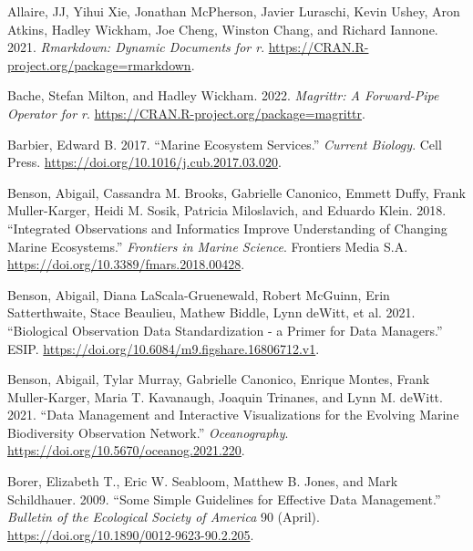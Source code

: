 \documentclass[
]{book}
\newlength{\cslhangindent}
\newlength{\cslentryspacingunit} %
\newenvironment{CSLReferences}[2] %
 {%
  \setlength{\parindent}{0pt}
  \ifodd #1
  \let\oldpar\par
  \def\par{\hangindent=\cslhangindent\oldpar}
  \fi
  \setlength{\parskip}{#2\cslentryspacingunit}
 }%
 {}
\begin{document}
\hypertarget{refs}{}
\begin{CSLReferences}{1}{0}
\leavevmode{}%
Allaire, JJ, Yihui Xie, Jonathan McPherson, Javier Luraschi, Kevin Ushey, Aron Atkins, Hadley Wickham, Joe Cheng, Winston Chang, and Richard Iannone. 2021. \emph{Rmarkdown: Dynamic Documents for r}. \url{https://CRAN.R-project.org/package=rmarkdown}.

\leavevmode{}%
Bache, Stefan Milton, and Hadley Wickham. 2022. \emph{Magrittr: A Forward-Pipe Operator for r}. \url{https://CRAN.R-project.org/package=magrittr}.

\leavevmode{}%
Barbier, Edward B. 2017. {``Marine Ecosystem Services.''} \emph{Current Biology}. Cell Press. \url{https://doi.org/10.1016/j.cub.2017.03.020}.

\leavevmode{}%
Benson, Abigail, Cassandra M. Brooks, Gabrielle Canonico, Emmett Duffy, Frank Muller-Karger, Heidi M. Sosik, Patricia Miloslavich, and Eduardo Klein. 2018. {``Integrated Observations and Informatics Improve Understanding of Changing Marine Ecosystems.''} \emph{Frontiers in Marine Science}. Frontiers Media S.A. \url{https://doi.org/10.3389/fmars.2018.00428}.

\leavevmode{}%
Benson, Abigail, Diana LaScala-Gruenewald, Robert McGuinn, Erin Satterthwaite, Stace Beaulieu, Mathew Biddle, Lynn deWitt, et al. 2021. {``Biological Observation Data Standardization - a Primer for Data Managers.''} ESIP. \url{https://doi.org/10.6084/m9.figshare.16806712.v1}.

\leavevmode{}%
Benson, Abigail, Tylar Murray, Gabrielle Canonico, Enrique Montes, Frank Muller-Karger, Maria T. Kavanaugh, Joaquin Trinanes, and Lynn M. deWitt. 2021. {``Data Management and Interactive Visualizations for the Evolving Marine Biodiversity Observation Network.''} \emph{Oceanography}. \url{https://doi.org/10.5670/oceanog.2021.220}.

\leavevmode{}%
Borer, Elizabeth T., Eric W. Seabloom, Matthew B. Jones, and Mark Schildhauer. 2009. {``Some Simple Guidelines for Effective Data Management.''} \emph{Bulletin of the Ecological Society of America} 90 (April). \url{https://doi.org/10.1890/0012-9623-90.2.205}.


\end{CSLReferences}
\end{document}
